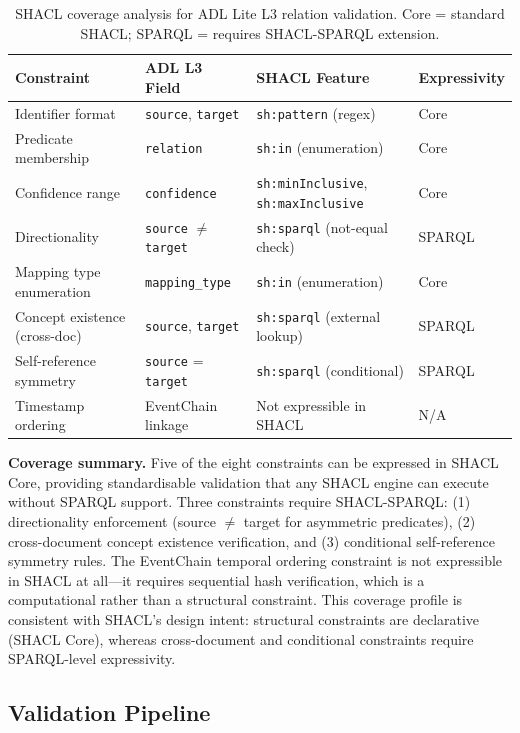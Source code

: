 \begin{table}[htbp]
\centering
\caption{SHACL coverage analysis for ADL Lite L3 relation validation. Core = standard SHACL; SPARQL = requires SHACL-SPARQL extension.}
\label{tab:shacl-coverage}
\begin{tabular}{@{}p{3.5cm}p{2.5cm}p{3.5cm}p{3.0cm}@{}}
\toprule
\textbf{Constraint} & \textbf{ADL L3 Field} & \textbf{SHACL Feature} & \textbf{Expressivity} \\
\midrule
Identifier format & \texttt{source}, \texttt{target} & \texttt{sh:pattern} (regex) & Core \\
Predicate membership & \texttt{relation} & \texttt{sh:in} (enumeration) & Core \\
Confidence range & \texttt{confidence} & \texttt{sh:minInclusive}, \texttt{sh:maxInclusive} & Core \\
Directionality & \texttt{source} $\neq$ \texttt{target} & \texttt{sh:sparql} (not-equal check) & SPARQL \\
Mapping type enumeration & \texttt{mapping\_type} & \texttt{sh:in} (enumeration) & Core \\
Concept existence (cross-doc) & \texttt{source}, \texttt{target} & \texttt{sh:sparql} (external lookup) & SPARQL \\
Self-reference symmetry & \texttt{source} = \texttt{target} & \texttt{sh:sparql} (conditional) & SPARQL \\
Timestamp ordering & EventChain linkage & Not expressible in SHACL & N/A \\
\bottomrule
\end{tabular}
\end{table}

\textbf{Coverage summary.} Five of the eight constraints can be expressed in SHACL Core, providing standardisable validation that any SHACL engine can execute without SPARQL support. Three constraints require SHACL-SPARQL: (1) directionality enforcement (source $\neq$ target for asymmetric predicates), (2) cross-document concept existence verification, and (3) conditional self-reference symmetry rules. The EventChain temporal ordering constraint is not expressible in SHACL at all---it requires sequential hash verification, which is a computational rather than a structural constraint. This coverage profile is consistent with SHACL's design intent: structural constraints are declarative (SHACL Core), whereas cross-document and conditional constraints require SPARQL-level expressivity.

\subsection{Validation Pipeline}

